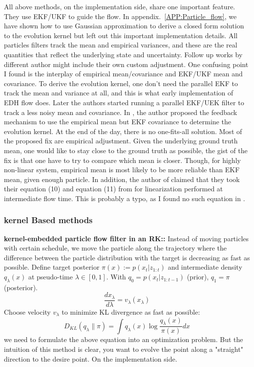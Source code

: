 \documentclass{article}
\begin{document}
All above methods, on the implementation side, share one important feature. They use EKF/UKF to guide the flow. In appendix.~\ref{APP:Particle_flow}, we have shown how to use Gaussian approximation to derive a closed form solution to the evolution kernel but left out this important implementation details. All particles filters track the mean and empirical variances, and these are the real quantities that reflect the underlying state and uncertainty. Follow up works by different author might include their own custom adjustment. One confusing point I found is the interplay of empirical mean/covariance and EKF/UKF mean and covariance. To derive the evolution kernel, one don't need the parallel EKF to track the mean and variance at all, and this is what early implementation of EDH flow does. Later the authors started running a parallel EKF/UEK filter to track a less noisy mean and covariance. In \cite{ding2012implementation}, the author proposed the feedback mechanism to use the empirical mean but EKF covariance to determine the evolution kernel. At the end of the day, there is no one-fits-all solution. Most of the proposed fix are empirical adjustment. Given the underlying ground truth mean, one would like to stay close to the ground truth as possible, the gist of the fix is that one have to try to compare which mean is closer. Though, for highly non-linear system, empirical mean is most likely to be more reliable than EKF mean, given enough particle. In addition, the author of \cite{Li-Particle-Filtering-2017} claimed that they took their equation (10) and equation (11) from \cite{ding2012implementation} for linearization performed at intermediate flow time. This is probably a typo, as I found no such equation in \cite{ding2012implementation}.

\subsubsection{kernel Based methods}
\textbf{kernel-embedded particle flow filter in an RK:\cite{Pulido2019,HuVanLeeuwen2021}:} Instead of moving particles with certain schedule, we move the particle along the trajectory where the difference between the particle distribution with the target is decreasing as fast as possible. 
Define target posterior $\pi(x) := p(x_t | z_{1:t})$ and intermediate density $q_\lambda(x)$ at pseudo-time $\lambda \in [0,1]$. With $q_0 = p(x_t | z_{1:t-1})$ (prior), $q_1 = \pi$ (posterior).
\begin{equation}
\frac{dx_\lambda}{d\lambda} = v_\lambda(x_\lambda)
\end{equation}
Choose velocity $v_\lambda$ to minimize KL divergence as fast as possible:
\begin{equation}
D_{KL}(q_\lambda \| \pi) = \int q_\lambda(x) \log \frac{q_\lambda(x)}{\pi(x)} dx
\end{equation}
we need to formulate the above equation into an optimization problem. But the intuition of this method is clear, you want to evolve the point along a "straight" direction to the desire point. On the implementation side. 
\end{document}
